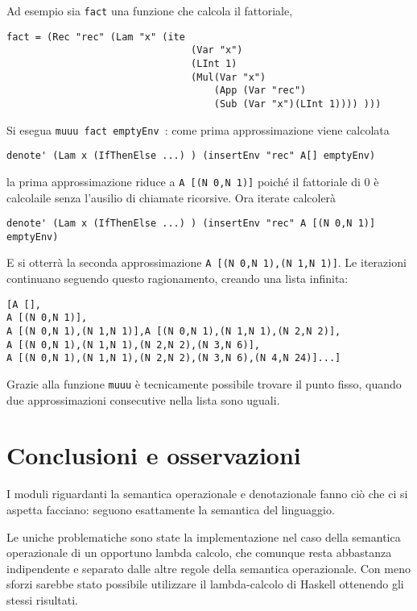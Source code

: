 \documentclass{article}
\begin{document}
Ad esempio sia \texttt{fact} una funzione che calcola il fattoriale, 

\begin{verbatim}
fact = (Rec "rec" (Lam "x" (ite 
                                (Var "x") 
                                (LInt 1)
                                (Mul(Var "x")
                                    (App (Var "rec")
                                    (Sub (Var "x")(LInt 1)))) )))
\end{verbatim}

Si esegua \texttt{muuu fact emptyEnv }:
come prima approssimazione viene calcolata 
\begin{verbatim}
denote' (Lam x (IfThenElse ...) ) (insertEnv "rec" A[] emptyEnv)
\end{verbatim}
la prima approssimazione riduce a \texttt{A [(N 0,N 1)]} poiché il fattoriale di 0 è calcolaile senza l'ausilio di chiamate ricorsive.
Ora iterate calcolerà
\begin{verbatim}
denote' (Lam x (IfThenElse ...) ) (insertEnv "rec" A [(N 0,N 1)] emptyEnv)
\end{verbatim}
E si otterrà la seconda approssimazione \texttt{A [(N 0,N 1),(N 1,N 1)]}.
Le iterazioni continuano seguendo questo ragionamento, creando una lista infinita:

\begin{verbatim}
[A [],
A [(N 0,N 1)],
A [(N 0,N 1),(N 1,N 1)],A [(N 0,N 1),(N 1,N 1),(N 2,N 2)],
A [(N 0,N 1),(N 1,N 1),(N 2,N 2),(N 3,N 6)],
A [(N 0,N 1),(N 1,N 1),(N 2,N 2),(N 3,N 6),(N 4,N 24)]...]
\end{verbatim}

Grazie alla funzione \texttt{muuu} è tecnicamente possibile trovare il punto fisso, quando due approssimazioni consecutive nella lista sono uguali.

\section{Conclusioni e osservazioni}

I moduli riguardanti la semantica operazionale e denotazionale fanno ciò che ci si aspetta facciano: seguono esattamente la semantica del linguaggio.

Le uniche problematiche sono state la implementazione nel caso della semantica operazionale di un opportuno lambda calcolo, che comunque resta abbastanza indipendente e separato dalle altre regole della semantica operazionale. Con meno sforzi sarebbe stato possibile utilizzare il lambda-calcolo di Haskell ottenendo gli stessi risultati.
\end{document}
